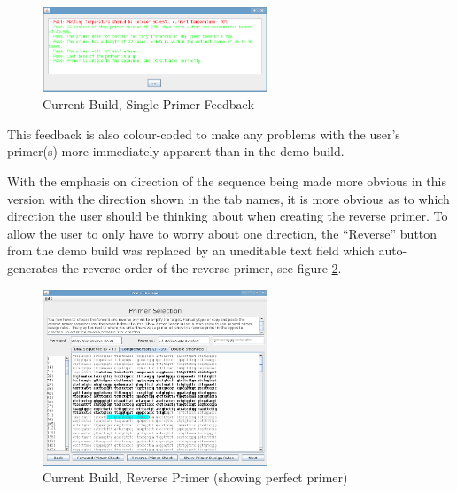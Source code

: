 \begin{figure}[h]
  \begin{center}
    \includegraphics[width=0.6\textwidth]{./images/currentBuild/primerEvalRed.png}
    \caption{
      \label{fig:currentBuild:primerEvalRed}
      Current Build, Single Primer Feedback
    }
  \end{center}
\end{figure}

This feedback is also colour-coded to make any problems with the
user's primer(s) more immediately apparent than in the demo build.

With the emphasis on direction of the sequence being made more obvious
in this version with the direction shown in the tab names, it is more
obvious as to which direction the user should be thinking about when
creating the reverse primer.
To allow the user to only have to worry about one direction, the
``Reverse'' button from the demo build was replaced by an uneditable
text field which auto-generates the reverse order of the reverse
primer, see figure \ref{fig:currentBuild:reversePrimerPerfect}.

\begin{figure}[h]
  \begin{center}
    \includegraphics[width=0.6\textwidth]{./images/currentBuild/reversePrimerPerfect.png}
    \caption{
      \label{fig:currentBuild:reversePrimerPerfect}
      Current Build, Reverse Primer (showing perfect primer)
    }
  \end{center}
\end{figure}

